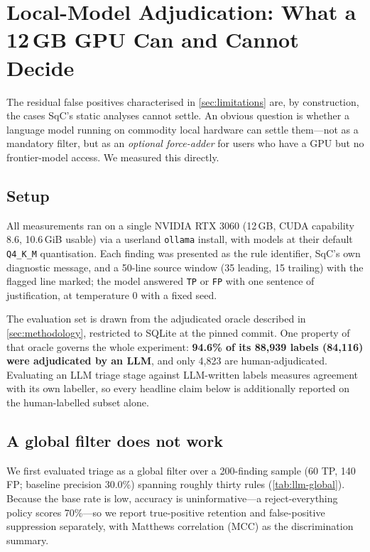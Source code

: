 \section{Local-Model Adjudication: What a 12\,GB GPU Can and Cannot Decide}
\label{sec:local-llm}

The residual false positives characterised in \cref{sec:limitations}
are, by construction, the cases SqC's static analyses cannot settle.
An obvious question is whether a language model running on commodity
local hardware can settle them---not as a mandatory filter, but as an
\emph{optional force-adder} for users who have a GPU but no
frontier-model access.  We measured this directly.

\subsection{Setup}

All measurements ran on a single NVIDIA RTX 3060 (12\,GB, CUDA
capability 8.6, 10.6\,GiB usable) via a userland \texttt{ollama}
install, with models at their default \texttt{Q4\_K\_M} quantisation.
Each finding was presented as the rule identifier, SqC's own diagnostic
message, and a 50-line source window (35 leading, 15 trailing) with the
flagged line marked; the model answered \texttt{TP} or \texttt{FP} with
one sentence of justification, at temperature 0 with a fixed seed.

The evaluation set is drawn from the adjudicated oracle described in
\cref{sec:methodology}, restricted to SQLite at the pinned commit.  One
property of that oracle governs the whole experiment: \textbf{94.6\% of
its 88,939 labels (84,116) were adjudicated by an LLM}, and only 4,823
are human-adjudicated.  Evaluating an LLM triage stage against
LLM-written labels measures agreement with its own labeller, so every
headline claim below is additionally reported on the human-labelled
subset alone.

\subsection{A global filter does not work}

We first evaluated triage as a global filter over a 200-finding sample
(60 TP, 140 FP; baseline precision 30.0\%) spanning roughly thirty
rules (\cref{tab:llm-global}).  Because the base rate is low, accuracy
is uninformative---a
reject-everything policy scores 70\%---so we report true-positive
retention and false-positive suppression separately, with Matthews
correlation (MCC) as the discrimination summary.

